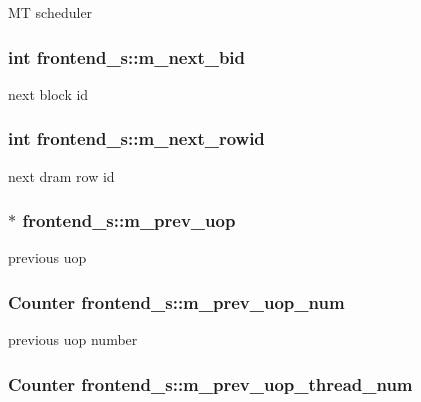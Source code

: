 \label{structfrontend__s_a448e3c3264b1dead315e8e1690405ecf}
MT scheduler \hypertarget{structfrontend__s_a93d8c54a2f3e0a300bd658f6b1c4655a}{
\subsubsection[{m\_\-next\_\-bid}]{\setlength{\rightskip}{0pt plus 5cm}int {\bf frontend\_\-s::m\_\-next\_\-bid}}}
\label{structfrontend__s_a93d8c54a2f3e0a300bd658f6b1c4655a}
next block id \hypertarget{structfrontend__s_a7a185d5c19de542ec9e69cb19cc713a3}{
\subsubsection[{m\_\-next\_\-rowid}]{\setlength{\rightskip}{0pt plus 5cm}int {\bf frontend\_\-s::m\_\-next\_\-rowid}}}
\label{structfrontend__s_a7a185d5c19de542ec9e69cb19cc713a3}
next dram row id \hypertarget{structfrontend__s_a6c09302921435eaa8a904b258f8b351b}{
\subsubsection[{m\_\-prev\_\-uop}]{$\ast$ {\bf frontend\_\-s::m\_\-prev\_\-uop}}}
\label{structfrontend__s_a6c09302921435eaa8a904b258f8b351b}
previous uop \hypertarget{structfrontend__s_ae0b61c16c88f0061c2fc1c8c9db61709}{
\subsubsection[{m\_\-prev\_\-uop\_\-num}]{\setlength{\rightskip}{0pt plus 5cm}Counter {\bf frontend\_\-s::m\_\-prev\_\-uop\_\-num}}}
\label{structfrontend__s_ae0b61c16c88f0061c2fc1c8c9db61709}
previous uop number \hypertarget{structfrontend__s_a4fec072ee6013132f739110f1928447c}{
\subsubsection[{m\_\-prev\_\-uop\_\-thread\_\-num}]{\setlength{\rightskip}{0pt plus 5cm}Counter {\bf frontend\_\-s::m\_\-prev\_\-uop\_\-thread\_\-num}}}
